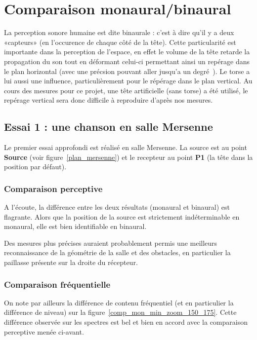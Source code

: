 \chapter{Comparaison monaural/binaural}

La perception sonore humaine est dite binaurale : c'est à dire qu'il y a deux «capteurs» (en l'occurence de chaque côté
de la tête).
Cette particularité est importante dans la perception de l'espace, en effet le volume de la tête retarde la propagation
du son tout en déformant celui-ci permettant ainsi un repérage dans le plan horizontal (avec une précsion pouvant aller
jusqu'a un degré~\cite{Vor08}). Le torse a lui aussi une influence, particulièrement pour le répérage dans le plan
vertical. Au cours des mesures pour ce projet, une tête artificielle (sans torse) a été utilisé, le repérage vertical
sera donc difficile à reproduire d'après nos mesures.

\section{Essai 1 : une chanson en salle Mersenne} %

Le premier essai approfondi est réalisé en salle Mersenne. La source est au point \textbf{Source} (voir
figure~\ref{plan_mersenne}) et le recepteur au point \textbf{P1} (la tête dans la position par défaut).

\subsection{Comparaison perceptive} %

A l'écoute, la différence entre les deux résultats (monaural et binaural) est flagrante. Alors que la position de la
source est strictement indéterminable en monaural, elle est bien identifiable en binaural.

Des mesures plus précises auraient probablement permis une meilleurs reconnaissance de la géométrie de la salle et des
obstacles, en particulier la paillasse présente sur la droite du récepteur.

\subsection{Comparaison fréquentielle} %

On note par ailleurs la différence de contenu fréquentiel (et en particulier la différence de niveau) sur la
figure~\ref{comp_mon_min_zoom_150_175}. Cette différence observée sur les spectres est bel et bien en accord avec la
comparaison perceptive menée ci-avant.


